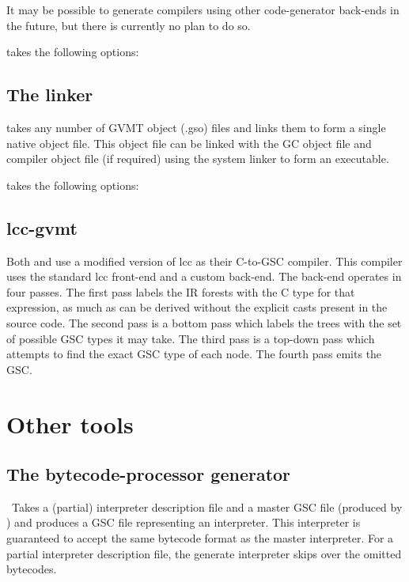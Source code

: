 It may be possible to generate compilers using other code-generator back-ends in the future, but there is currently no plan to do so.

\gvmtcc{} takes the following options:



\subsection{The linker \glink{}\label{sect:glink}}
\glink{} takes any number of GVMT object (.gso) files and links them to form a single native object file.
This object file can be linked with the GC object file and compiler object file (if required)
using the system linker to form an executable.

\glink{} takes the following options:



\subsection{lcc-gvmt\label{sect:lcc}}
Both \gvmtic{} and \gvmtc{} use a modified version of lcc as their C-to-GSC compiler. This compiler uses the standard lcc front-end and a custom back-end. The back-end operates in four passes. The first pass labels the IR forests with the C type for that expression, as much as can be derived without the explicit casts present in the source code. The second pass is a bottom pass which labels the trees with the set 
of possible GSC types it may take. The third pass is a top-down pass which attempts to find the exact GSC type of each node. The fourth pass emits the GSC.

\section{Other tools}

\subsection{The bytecode-processor generator \gvmtxc\label{sect:gvmtxc}}
\gvmtxc\ Takes a (partial) interpreter description file and a master GSC file (produced by \gvmtic) and produces a GSC file representing an interpreter. This interpreter is guaranteed to accept the same bytecode format as the master interpreter.
For a partial interpreter description file, the generate interpreter skips over the omitted bytecodes.

